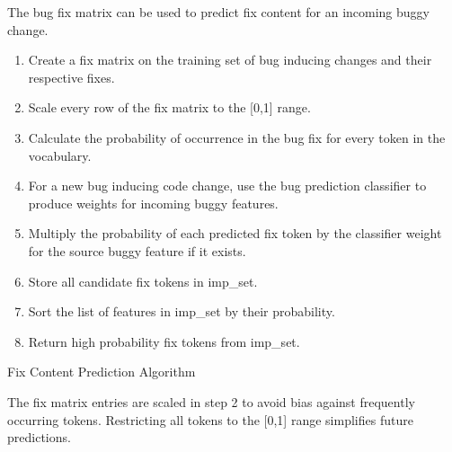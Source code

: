 \documentclass[10pt, conference, letterpaper, compsocconf]{IEEEtran}
\begin{document}
The bug fix matrix can be used to predict
fix content for an incoming buggy change.
\begin{algorithm}
\begin{enumerate}
\item Create a fix matrix on the training set of bug inducing changes and
their respective fixes.
\item Scale every row of the fix matrix to the [0,1] range.
\item Calculate the probability of occurrence in the bug fix for every token in the vocabulary.
\item For a new bug inducing code change, use the bug prediction classifier to produce weights for incoming buggy features.
\item Multiply the probability of each predicted fix token by the classifier weight for the source buggy feature if it exists.
\item Store all candidate fix tokens in imp\_set.
\item Sort the list of features in imp\_set by their probability.
\item Return high probability fix tokens from imp\_set.
\end{enumerate}
\caption{Fix Content Prediction Algorithm}
\end{algorithm}


The fix matrix entries are scaled in step 2 to avoid bias against frequently occurring tokens. Restricting all tokens to the [0,1] range simplifies future predictions.
\end{document}
